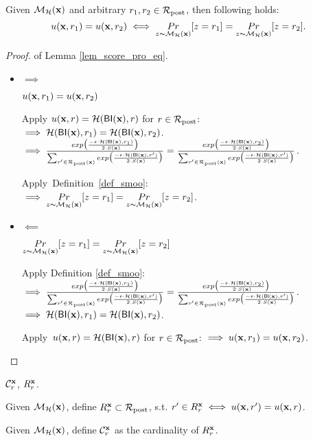 \documentclass{article}
\begin{document}
\begin{lem}
\label{lem_score_pro_eq}
  Given $\hexpmech(\dataobs)$ and arbitrary $r_1, r_2 \in \candidateset$, then following holds:
  $$
  \ux{r_1} = \ux{r_2} \iff \hexpmechPr{\dataobs}{z = r_1} = \hexpmechPr{\dataobs}{z = r_2}.
  $$  
\end{lem}
\begin{proof} of Lemma \ref{lem_score_pro_eq}.
\begin{itemize}
  \item $\implies$

  $\ux{r_1} = \ux{r_2}$

  Apply $\ux{r} = \hellinger(\bysinfer(\dataobs), r)$ for $r \in \candidateset$:\\
  $\implies \hellinger(\bysinfer(\dataobs), r_1) = \hellinger(\bysinfer(\dataobs), r_2)$. \\
  $\implies \frac {exp\big(\frac{-\epsilon\cdot\hellinger(\bysinfer(\dataobs),r_1)}{2\cdot S(\dataobs)}\big)}{\nomalizer{\dataobs}} 
  = \frac {exp\big(\frac{-\epsilon\cdot\hellinger(\bysinfer(\dataobs),r_2)}{2\cdot S(\dataobs)}\big)}{\nomalizer{\dataobs}}$.

  Apply\ Definition\ \ref{def_smoo}:\\
  $\implies \hexpmechPr{\dataobs}{z = r_1} = \hexpmechPr{\dataobs}{z = r_2}$.


  \item $\impliedby$

  $\hexpmechPr{\dataobs}{z = r_1} = \hexpmechPr{\dataobs}{z = r_2} $

  Apply Definition \ref{def_smoo}:\\
  $\implies \frac {exp\big(\frac{-\epsilon\cdot\hellinger(\bysinfer(\dataobs),r_1)}{2\cdot S(\dataobs)}\big)}{\nomalizer{\dataobs}} 
    = \frac {exp\big(\frac{-\epsilon\cdot\hellinger(\bysinfer(\dataobs),r_2)}{2\cdot S(\dataobs)}\big)}{\nomalizer{\dataobs}}$.\\
  $\implies  \hellinger(\bysinfer(\dataobs), r_1) = \hellinger(\bysinfer(\dataobs), r_2)$.

  Apply\ $\ux{r} = \hellinger(\bysinfer(\dataobs), r)$ for $r \in \candidateset$:
  $\implies \ux{r_1} = \ux{r_2}$.

\end{itemize}

\end{proof}

\begin{definition}
\label{def_cardinality}
  $\cardinality{\dataobs}{r}$, $R^{\dataobs}_r$.

  Given $\hexpmech(\dataobs)$, define $R^{\dataobs}_r \subset \candidateset$, s.t. $r' \in R^{\dataobs}_r \iff \ux{r'} = \ux{r}$.

  Given $\hexpmech(\dataobs)$, define $\cardinality{\dataobs}{r}$ as the cardinality of $R^{\dataobs}_r$. 
\end{definition}
\end{document}
